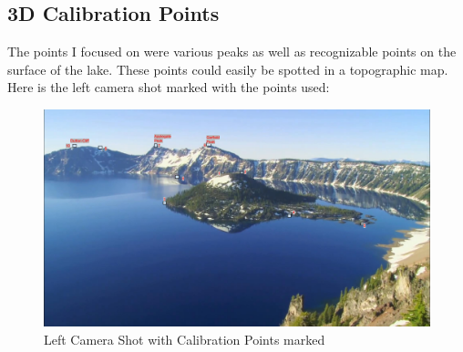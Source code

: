 \documentclass[11pt,psfig]{article}
\begin{document}
\subsection{3D Calibration Points}

The points I focused on were various peaks as well as recognizable points on the surface of the lake. These points could easily be spotted in a topographic map. Here is the left camera shot marked with the points used:
\begin{figure}[H]
\centering
\includegraphics[width=\columnwidth]{sfmResults1/Photo_withPoints.png}
\caption{Left Camera Shot with Calibration Points marked}
\end{figure}

\newpage
\end{document}
